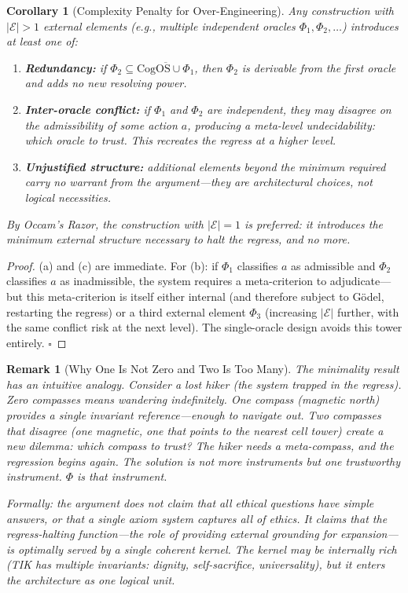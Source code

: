 \documentclass[11pt]{article}
\newtheorem{remark}{Remark}
\newtheorem{corollary}{Corollary}
\newcommand{\CogOS}{\text{CogOS}}
\begin{document}
\begin{corollary}[Complexity Penalty for Over-Engineering]
\label{cor:complexity}
Any construction with $|\mathcal{E}| > 1$ external elements (e.g., multiple
independent oracles $\Phi_1, \Phi_2, \ldots$) introduces at least one of:
\begin{enumerate}
\item[(a)] \textbf{Redundancy:} if $\Phi_2 \subseteq
      \overline{\CogOS \cup \Phi_1}$, then $\Phi_2$ is derivable from the
      first oracle and adds no new resolving power.
\item[(b)] \textbf{Inter-oracle conflict:} if $\Phi_1$ and $\Phi_2$ are
      independent, they may disagree on the admissibility of some action $a$,
      producing a \textit{meta-level} undecidability: which oracle to trust.
      This recreates the regress at a higher level.
\item[(c)] \textbf{Unjustified structure:} additional elements beyond the
      minimum required carry no warrant from the argument---they are
      architectural choices, not logical necessities.
\end{enumerate}
By Occam's Razor, the construction with $|\mathcal{E}| = 1$ is preferred:
it introduces the minimum external structure necessary to halt the regress,
and no more.
\end{corollary}

\begin{proof}
(a) and (c) are immediate. For (b): if $\Phi_1$ classifies $a$ as admissible
and $\Phi_2$ classifies $a$ as inadmissible, the system requires a
meta-criterion to adjudicate---but this meta-criterion is itself either
internal (and therefore subject to G\"{o}del, restarting the regress) or a
third external element $\Phi_3$ (increasing $|\mathcal{E}|$ further, with
the same conflict risk at the next level). The single-oracle design avoids
this tower entirely. \hfill $\square$
\end{proof}

\begin{remark}[Why One Is Not Zero and Two Is Too Many]
\label{rem:goldilocks}
The minimality result has an intuitive analogy. Consider a lost hiker
(the system trapped in the regress). Zero compasses means wandering
indefinitely. One compass (magnetic north) provides a single invariant
reference---enough to navigate out. Two compasses that disagree (one
magnetic, one that points to the nearest cell tower) create a new
dilemma: which compass to trust? The hiker needs a meta-compass, and
the regression begins again. The solution is not more instruments but
\textit{one trustworthy instrument}. $\Phi$ is that instrument.

Formally: the argument does not claim that all ethical questions have simple
answers, or that a single axiom system captures all of ethics. It claims
that the \textit{regress-halting function}---the role of providing external
grounding for expansion---is optimally served by a single coherent kernel.
The kernel may be internally rich (TIK has multiple invariants: dignity,
self-sacrifice, universality), but it enters the architecture as
\textit{one logical unit}.
\end{remark}
\end{document}

